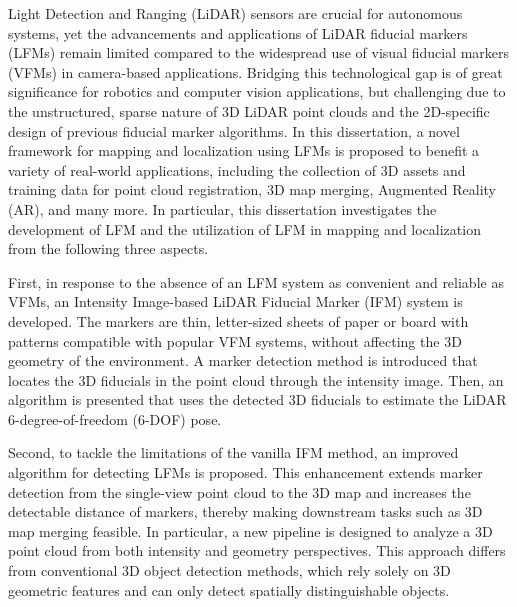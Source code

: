 Light Detection and Ranging (LiDAR) sensors are crucial for autonomous systems, yet the advancements and applications of LiDAR fiducial markers (LFMs) remain limited compared to the widespread use of visual fiducial markers (VFMs) in camera-based applications. Bridging this technological gap is of great significance for robotics and computer vision applications, but challenging due to the unstructured, sparse nature of 3D LiDAR point clouds and the 2D-specific design of previous fiducial marker algorithms. In this dissertation, a novel framework for mapping and localization using LFMs is proposed to benefit a variety of real-world applications, including the collection of 3D assets and training data for point cloud registration, 3D map merging, Augmented Reality (AR), and many more. In particular, this dissertation investigates the development of LFM and the utilization of LFM in mapping and localization from the following three aspects.
\par
First, in response to the absence of an LFM system as convenient and reliable as VFMs, an Intensity Image-based LiDAR Fiducial Marker (IFM) system is developed. The markers are thin, letter-sized sheets of paper or board with patterns compatible with popular VFM systems, without affecting the 3D geometry of the environment. A marker detection method is introduced that locates the 3D fiducials in the point cloud through the intensity image. Then, an algorithm is presented that uses the detected 3D fiducials to estimate the LiDAR 6-degree-of-freedom (6-DOF) pose.
\par
Second, to tackle the limitations of the vanilla IFM method, an improved algorithm for detecting LFMs is proposed. This enhancement extends marker detection from the single-view point cloud to the 3D map and increases the detectable distance of markers, thereby making downstream tasks such as 3D map merging feasible. In particular, a new pipeline is designed to analyze a 3D point cloud from both intensity and geometry perspectives. This approach differs from conventional 3D object detection methods, which rely solely on 3D geometric features and can only detect spatially distinguishable objects.

